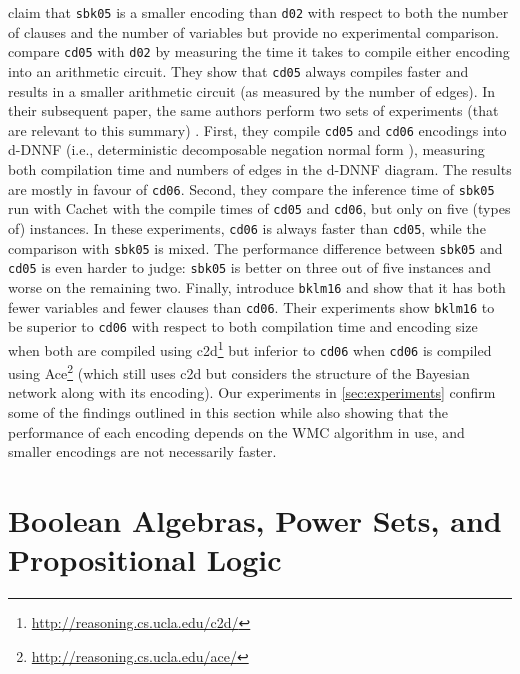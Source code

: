 \documentclass{uai2021} %
\theoremstyle{definition}
\begin{document}
\citet{DBLP:conf/aaai/SangBK05} claim that
\texttt{sbk05} is a smaller encoding than \texttt{d02} with respect to both the
number of clauses and the number of variables but provide no experimental
comparison. \citet{DBLP:conf/ijcai/ChaviraD05} compare \texttt{cd05} with
\texttt{d02} by measuring the time it takes to compile either encoding into an
arithmetic circuit. They show that
\texttt{cd05} always compiles faster and results in a smaller arithmetic circuit
(as measured by the number of edges). In their subsequent paper, the same
authors perform two sets of experiments (that are relevant to this summary)
\citep{DBLP:conf/sat/ChaviraD06}. First, they compile \texttt{cd05} and
\texttt{cd06} encodings into d-DNNF (i.e., deterministic decomposable negation
normal form \citep{DBLP:journals/jancl/Darwiche01}), measuring both compilation
time and numbers of edges in the d-DNNF diagram. The results are mostly in
favour of \texttt{cd06}. Second, they compare the inference time of
\texttt{sbk05} run with \textsf{Cachet} \citep{DBLP:conf/sat/SangBBKP04} with
the compile times of \texttt{cd05} and \texttt{cd06}, but only on five (types
of) instances. In these experiments, \texttt{cd06} is always faster than
\texttt{cd05}, while the comparison with \texttt{sbk05} is mixed.  The
performance difference between \texttt{sbk05} and \texttt{cd05} is even harder
to judge: \texttt{sbk05} is better on three out of five instances and worse on
the remaining two. Finally, \citet{DBLP:conf/ecai/BartKLM16} introduce
\texttt{bklm16} and show that it has both fewer variables and fewer clauses than
\texttt{cd06}. Their experiments show \texttt{bklm16} to be superior to
\texttt{cd06} with respect to both compilation time and encoding size when both
are compiled using
\textsf{c2d}\footnote{\url{http://reasoning.cs.ucla.edu/c2d/}}
\citep{DBLP:conf/ecai/Darwiche04} but inferior to \texttt{cd06} when
\texttt{cd06} is compiled using
\textsf{Ace}\footnote{\url{http://reasoning.cs.ucla.edu/ace/}} (which still uses
\textsf{c2d} but considers the structure of the Bayesian network along with its
encoding). Our experiments in \cref{sec:experiments} confirm some of the
findings outlined in this section while also showing that the performance of
each encoding depends on the WMC algorithm in use, and smaller encodings are not
necessarily faster.

\section{Boolean Algebras, Power Sets, and Propositional
  Logic} \label{sec:prelims}
\end{document}
